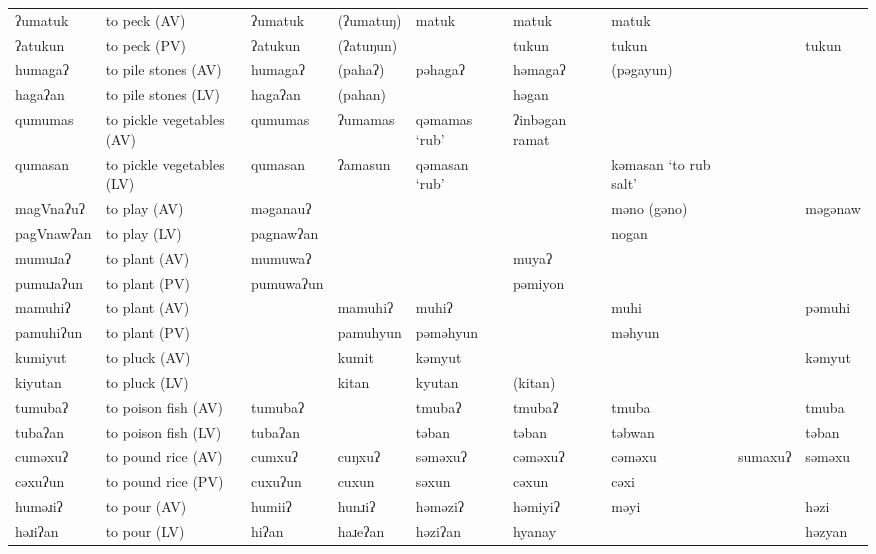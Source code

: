 \begin{landscape}
\begin{longtable}{*{9}{>{\raggedright\arraybackslash}p{}}}
\text{*}ʔumatuk      & to peck (AV) & ʔumatuk & (ʔumatuŋ) & matuk & matuk & matuk &  & \\
\text{*}ʔatukun      & to peck (PV) & ʔatukun & (ʔatuŋun) &  & tukun & tukun &  & tukun\\
\text{*}humagaʔ      & to pile stones (AV) & humagaʔ & (pahaʔ) & pəhagaʔ & həmagaʔ & (pəgayun) &  & \\
\text{*}hagaʔan      & to pile stones (LV) & hagaʔan & (pahan) &  & həgan &  &  & \\
\text{*}qumumas      & to pickle vegetables (AV) & qumumas & ʔumamas & qəmamas `rub' & ʔinbəgan ramat &  &  & \\
\text{*}qumasan      & to pickle vegetables (LV) & qumasan & ʔamasun & qəmasan `rub' &  & kəmasan \newline `to rub salt' &  & \\
\text{*}magVnaʔuʔ    & to play (AV) & məganauʔ &  &  &  & məno (gəno) &  & məgənaw\\
\text{*}pagVnawʔan   & to play (LV) & pagnawʔan &  &  &  & nogan &  & \\
\text{*}mumuɹaʔ      & to plant (AV) & mumuwaʔ &  &  & muyaʔ &  &  & \\
\text{*}pumuɹaʔun    & to plant (PV) & pumuwaʔun &  &  & pəmiyon &  &  & \\
\text{*}mamuhiʔ      & to plant (AV) &  & mamuhiʔ & muhiʔ &  & muhi &  & pəmuhi\\
\text{*}pamuhiʔun    & to plant (PV) &  & pamuhyun & pəməhyun &  & məhyun &  & \\
\text{*}kumiyut      & to pluck (AV) &  & kumit & kəmyut &  &  &  & kəmyut\\
\text{*}kiyutan      & to pluck (LV) &  & kitan & kyutan & (kitan) &  &  & \\
\text{*}tumubaʔ      & to poison fish (AV) & tumubaʔ &  & tmubaʔ & tmubaʔ & tmuba &  & tmuba\\
\text{*}tubaʔan      & to poison fish (LV) & tubaʔan &  & təban & təban & təbwan &  & təban\\
\text{*}cuməxuʔ      & to pound rice (AV) & cumxuʔ & cuŋxuʔ & səməxuʔ & cəməxuʔ & cəməxu & sumaxuʔ & səməxu\\
\text{*}cəxuʔun      & to pound rice (PV) & cuxuʔun & cuxun & səxun & cəxun & cəxi &  & \\
\text{*}huməɹiʔ      & to pour (AV) & humiiʔ & hunɹiʔ & həməziʔ & həmiyiʔ & məyi &  & həzi\\
\text{*}həɹiʔan      & to pour (LV) & hiʔan & haɹeʔan & həziʔan & hyanay &  &  & həzyan\\

\end{longtable}
\end{landscape}
